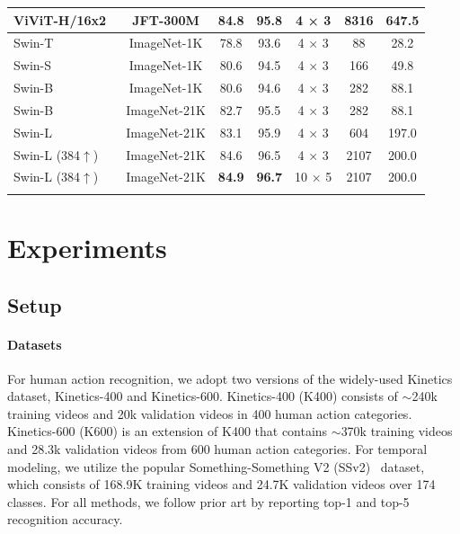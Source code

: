 \documentclass{article}
\newcommand{\demph}[1]{\textcolor[rgb]{0.565,0.565,0.565}{#1}}
\begin{document}
\begin{table}[t]
\begin{tabular}{l|c|cc|c|cc}
  \demph{ViViT-H/16x2~\cite{arnab2021vivit}} & \demph{JFT-300M} & \demph{84.8} & \demph{95.8} & \demph{4 × 3} & \demph{8316}& \demph{647.5}\\
  \hline
  Swin-T & ImageNet-1K & 78.8 & 93.6 & 4 × 3 & 88 & 28.2 \\
  Swin-S & ImageNet-1K & 80.6 & 94.5 & 4 × 3 & 166 & 49.8 \\
  Swin-B & ImageNet-1K & 80.6 & 94.6 & 4 × 3 & 282 & 88.1 \\
  Swin-B & ImageNet-21K & 82.7 & 95.5 & 4 × 3 & 282 & 88.1 \\ 
  Swin-L & ImageNet-21K & 83.1 & 95.9 & 4 × 3 & 604 & 197.0 \\
  Swin-L (384$\uparrow$) & ImageNet-21K & 84.6 & 96.5 & 4 × 3 & 2107 & 200.0 \\ 
  Swin-L (384$\uparrow$) & ImageNet-21K & \textbf{84.9} & \textbf{96.7} & 10 × 5 & 2107 & 200.0 \\
\Xhline{1.0pt}
  \end{tabular}
\label{tab:k400}
\end{table}


\section{Experiments}

\subsection{Setup}
\label{subsec:setup}
\paragraph{Datasets} For human action recognition, we adopt two versions of the widely-used Kinetics \cite{kay2017kinetics} dataset, Kinetics-400 and Kinetics-600.
Kinetics-400 (K400) consists of $\sim$240k training videos and 20k validation videos in 400 human action categories. 
Kinetics-600 (K600) is an extension of K400 that contains $\sim$370k training videos and 28.3k validation videos from 600 human action categories. 
For temporal modeling, we utilize the popular Something-Something V2 (SSv2)~\cite{goyal2017ssv2} dataset, which consists of 168.9K training videos and 24.7K validation videos over 174 classes.
For all methods, we follow prior art by reporting top-1 and top-5 recognition accuracy.
\end{document}
